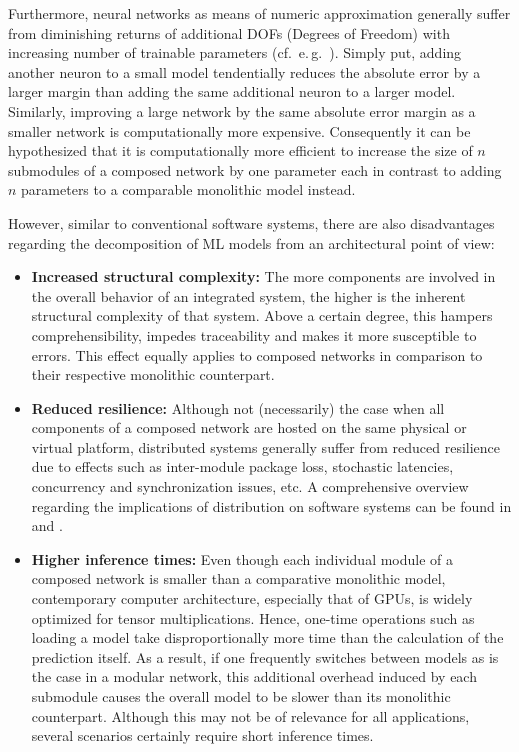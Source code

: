\begin{itemize}
\begin{itemize}
            Furthermore, neural networks as means of numeric approximation generally suffer from diminishing returns of additional DOFs (Degrees of Freedom) with increasing number of trainable parameters (cf.\ e.\,g.\ \cite{Lawrence1996-uj}). Simply put, adding another neuron to a small model tendentially reduces the absolute error by a larger margin than adding the same additional neuron to a larger model. Similarly, improving a large network by the same absolute error margin as a smaller network is computationally more expensive. Consequently it can be hypothesized that it is computationally more efficient to increase the size of $n$ submodules of a composed network by one parameter each in contrast to adding $n$ parameters to a comparable monolithic model instead.
        \end{itemize}
\end{itemize}

However, similar to conventional software systems, there are also disadvantages regarding the decomposition of ML models from an architectural point of view:

\begin{itemize}
    \item \textbf{Increased structural complexity:} The more components are involved in the overall behavior of an integrated system, the higher is the inherent structural complexity of that system. Above a certain degree, this hampers comprehensibility, impedes traceability and makes it more susceptible to errors. This effect equally applies to composed networks in comparison to their respective monolithic counterpart.
    \item \textbf{Reduced resilience:} Although not (necessarily) the case when all components of a composed network are hosted on the same physical or virtual platform, distributed systems generally suffer from reduced resilience due to effects such as inter-module package loss, stochastic latencies, concurrency and synchronization issues, etc. A comprehensive overview regarding the implications of distribution on software systems can be found in \cite{Lynch1989-ev} and \cite{Van_Steen2017-gb}.
    \item \textbf{Higher inference times:} Even though each individual module of a composed network is smaller than a comparative monolithic model, contemporary computer architecture, especially that of GPUs, is widely optimized for tensor multiplications. Hence, one-time operations such as loading a model take disproportionally more time than the calculation of the prediction itself. As a result, if one frequently switches between models as is the case in a modular network, this additional overhead induced by each submodule causes the overall model to be slower than its monolithic counterpart. Although this may not be of relevance for all applications, several scenarios certainly require short inference times.
\end{itemize}

